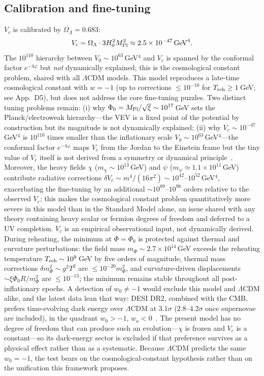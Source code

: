 \documentclass[pdflatex,sn-mathphys-num]{sn-jnl}
\newcommand{\MP}{M_{\rm Pl}}
\newcommand{\PhiV}{\Phi_0}
\theoremstyle{thmstyleone}
\begin{document}
\subsection{Calibration and fine-tuning}

$V_c$ is calibrated by $\Omega_\Lambda=0.683$:
\begin{equation}
V_c=\Omega_\Lambda\cdot3H_0^2\MP^2\approx2.5\times10^{-47}\,{\rm GeV}^4.
\label{eq:Vc}
\end{equation}
The $10^{110}$ hierarchy between $V_0\sim10^{63}\,$GeV$^4$ and $V_c$ is spanned by the conformal factor $e^{-4\varphi}$ but \emph{not} dynamically explained; this is the cosmological constant problem, shared with all $\Lambda$CDM models. This model reproduces a late-time cosmological constant with $w=-1$ (up to corrections $\leq10^{-10}$ for $T_{\rm reh}\geq1\,$GeV; see App.~D5), but does not address the core fine-tuning puzzles. Two distinct tuning problems remain: (i) why $\PhiV=\MP/\sqrt{\xi}\sim10^{17}\,$GeV sets the Planck/electroweak hierarchy---the VEV is a fixed point of the potential by construction but its magnitude is not dynamically explained; (ii) why $V_c\sim10^{-47}\,$GeV$^4$ is $10^{110}$ times smaller than the inflationary scale $V_0\sim10^{63}\,$GeV$^4$---the conformal factor $e^{-4\varphi}$ maps $V_c$ from the Jordan to the Einstein frame but the tiny value of $V_c$ itself is not derived from a symmetry or dynamical principle~\cite{Weinberg1989}. Moreover, the heavy fields $\chi$ ($m_\chi\sim10^{13}\,$GeV) and $\psi$ ($m_\psi\simeq1.1\times10^{11}\,$GeV) contribute radiative corrections $\delta V_c\sim m^4/(16\pi^2)\sim10^{42}$--$10^{52}\,$GeV$^4$, exacerbating the fine-tuning by an additional $\sim10^{89}$--$10^{98}$ orders relative to the observed $V_c$; this makes the cosmological constant problem quantitatively more severe in this model than in the Standard Model alone, an issue shared with any theory containing heavy scalar or fermion degrees of freedom and deferred to a UV completion. $V_c$ is an empirical observational input, not dynamically derived. During reheating, the minimum at $\Phi=\PhiV$ is protected against thermal and curvature perturbations: the field mass $m_\Phi\sim2.7\times10^{14}\,$GeV exceeds the reheating temperature $T_{\rm reh}\sim10^9\,$GeV by five orders of magnitude, thermal mass corrections $\delta m_\Phi^2\sim g^2 T^2$ are $\leq10^{-20}m_\Phi^2$, and curvature-driven displacements $\sim\xi\PhiV R/m_\Phi^2$ are $\leq10^{-13}$; the minimum remains stable throughout all post-inflationary epochs. A detection of $w_0\neq-1$ would exclude this model and $\Lambda$CDM alike, and the latest data lean that way: DESI DR2, combined with the CMB, prefers time-evolving dark energy over $\Lambda$CDM at $3.1\sigma$ ($2.8$--$4.2\sigma$ once supernovae are included), in the quadrant $w_0>-1$, $w_a<0$~\cite{DESI2025}. The present model has no degree of freedom that can produce such an evolution---$\chi$ is frozen and $V_c$ is a constant---so its dark-energy sector is excluded if that preference survives as a physical effect rather than as a systematic. Because $\Lambda$CDM predicts the same $w_0=-1$, the test bears on the cosmological-constant hypothesis rather than on the unification this framework proposes.
\end{document}
